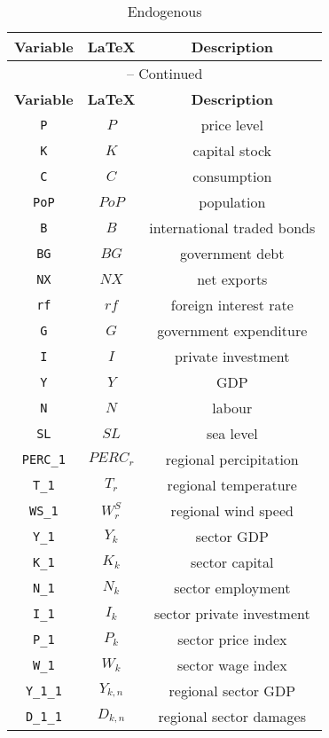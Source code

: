 \begin{center}
\begin{longtable}{ccc}
\caption{Endogenous}\\%
\hline%
\multicolumn{1}{c}{\textbf{Variable}} &
\multicolumn{1}{c}{\textbf{\LaTeX}} &
\multicolumn{1}{c}{\textbf{Description}}\\%
\hline\hline%
\endfirsthead
\multicolumn{3}{c}{{\tablename} \thetable{} -- Continued}\\%
\hline%
\multicolumn{1}{c}{\textbf{Variable}} &
\multicolumn{1}{c}{\textbf{\LaTeX}} &
\multicolumn{1}{c}{\textbf{Description}}\\%
\hline\hline%
\endhead
\texttt{P} & $P$ & price level\\
\texttt{K} & $K$ & capital stock\\
\texttt{C} & $C$ & consumption\\
\texttt{PoP} & $PoP$ & population\\
\texttt{B} & $B$ & international traded bonds\\
\texttt{BG} & $BG$ & government debt\\
\texttt{NX} & $NX$ & net exports\\
\texttt{rf} & $rf$ & foreign interest rate\\
\texttt{G} & $G$ & government expenditure\\
\texttt{I} & $I$ & private investment\\
\texttt{Y} & $Y$ & GDP\\
\texttt{N} & $N$ & labour\\
\texttt{SL} & ${SL}$ & sea level\\
\texttt{PERC\_1} & ${PERC_{r}}$ & regional percipitation\\
\texttt{T\_1} & ${T_{r}}$ & regional temperature\\
\texttt{WS\_1} & ${W_{r}^{S}}$ & regional wind speed\\
\texttt{Y\_1} & ${Y_k}$ & sector GDP\\
\texttt{K\_1} & ${K_k}$ & sector capital\\
\texttt{N\_1} & ${N_k}$ & sector employment\\
\texttt{I\_1} & ${I_k}$ & sector private investment\\
\texttt{P\_1} & ${P_k}$ & sector price index\\
\texttt{W\_1} & ${W_k}$ & sector wage index\\
\texttt{Y\_1\_1} & ${Y_{k,n}}$ & regional sector GDP\\
\texttt{D\_1\_1} & ${D_{k,n}}$ & regional sector damages\\

\end{longtable}
\end{center}
